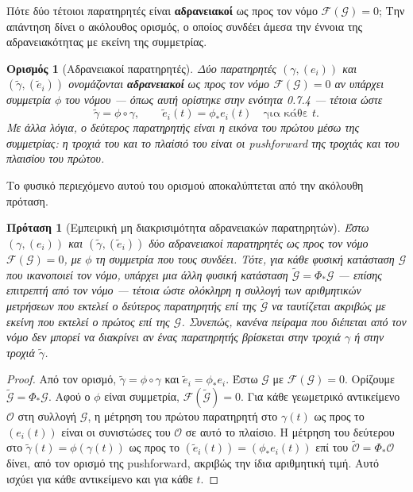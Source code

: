 \documentclass[11pt,a4paper,twoside,openright]{book}
\newtheorem{proposition}[lemma]{Πρόταση}
\newtheorem{definition}[lemma]{Ορισμός}
\begin{document}
Πότε δύο τέτοιοι παρατηρητές είναι \textbf{αδρανειακοί} ως προς τον νόμο $\mathcal{F}(\mathcal{G}) = 0$; Την απάντηση δίνει ο ακόλουθος ορισμός, ο οποίος συνδέει άμεσα την έννοια της αδρανειακότητας με εκείνη της συμμετρίας.

\begin{definition}[Αδρανειακοί παρατηρητές]
Δύο παρατηρητές $(\gamma, (e_i))$ και $(\tilde{\gamma}, (\tilde{e}_i))$ ονομάζονται \textbf{αδρανειακοί} ως προς τον νόμο $\mathcal{F}(\mathcal{G}) = 0$ αν υπάρχει συμμετρία $\phi$ του νόμου — όπως αυτή ορίστηκε στην ενότητα 0.7.4 — τέτοια ώστε
\[
\tilde{\gamma} = \phi \circ \gamma, \qquad \tilde{e}_i(t) = \phi_* e_i(t) \quad \text{για κάθε } t.
\]
Με άλλα λόγια, ο δεύτερος παρατηρητής είναι η εικόνα του πρώτου μέσω της συμμετρίας: η τροχιά του και το πλαίσιό του είναι οι pushforward της τροχιάς και του πλαισίου του πρώτου.
\end{definition}

Το φυσικό περιεχόμενο αυτού του ορισμού αποκαλύπτεται από την ακόλουθη πρόταση.

\begin{proposition}[Εμπειρική μη διακρισιμότητα αδρανειακών παρατηρητών]
\label{prop:indistinguishability}
Έστω $(\gamma, (e_i))$ και $(\tilde{\gamma}, (\tilde{e}_i))$ δύο αδρανειακοί παρατηρητές ως προς τον νόμο $\mathcal{F}(\mathcal{G}) = 0$, με $\phi$ τη συμμετρία που τους συνδέει. Τότε, για κάθε φυσική κατάσταση $\mathcal{G}$ που ικανοποιεί τον νόμο, υπάρχει μια άλλη φυσική κατάσταση $\tilde{\mathcal{G}} = \Phi_* \mathcal{G}$ — επίσης επιτρεπτή από τον νόμο — τέτοια ώστε ολόκληρη η συλλογή των αριθμητικών μετρήσεων που εκτελεί ο δεύτερος παρατηρητής επί της $\tilde{\mathcal{G}}$ να ταυτίζεται ακριβώς με εκείνη που εκτελεί ο πρώτος επί της $\mathcal{G}$. Συνεπώς, κανένα πείραμα που διέπεται από τον νόμο δεν μπορεί να διακρίνει αν ένας παρατηρητής βρίσκεται στην τροχιά $\gamma$ ή στην τροχιά $\tilde{\gamma}$.
\end{proposition}

\begin{proof}
Από τον ορισμό, $\tilde{\gamma} = \phi \circ \gamma$ και $\tilde{e}_i = \phi_* e_i$. Έστω $\mathcal{G}$ με $\mathcal{F}(\mathcal{G}) = 0$. Ορίζουμε $\tilde{\mathcal{G}} = \Phi_* \mathcal{G}$. Αφού ο $\phi$ είναι συμμετρία, $\mathcal{F}(\tilde{\mathcal{G}}) = 0$. Για κάθε γεωμετρικό αντικείμενο $\mathcal{O}$ στη συλλογή $\mathcal{G}$, η μέτρηση του πρώτου παρατηρητή στο $\gamma(t)$ ως προς το $(e_i(t))$ είναι οι συνιστώσες του $\mathcal{O}$ σε αυτό το πλαίσιο. Η μέτρηση του δεύτερου στο $\tilde{\gamma}(t) = \phi(\gamma(t))$ ως προς το $(\tilde{e}_i(t)) = (\phi_* e_i(t))$ επί του $\tilde{\mathcal{O}} = \Phi_* \mathcal{O}$ δίνει, από τον ορισμό της pushforward, ακριβώς την ίδια αριθμητική τιμή. Αυτό ισχύει για κάθε αντικείμενο και για κάθε $t$.
\end{proof}
\end{document}
